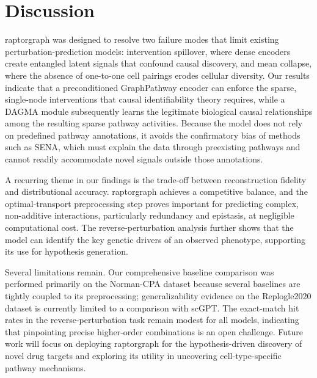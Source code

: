 \section*{Discussion}
\gls{raptorgraph} was designed to resolve two failure modes that limit existing perturbation-prediction models: intervention spillover, where dense encoders create entangled latent signals that confound causal discovery, and mean collapse, where the absence of one-to-one cell pairings erodes cellular diversity.
Our results indicate that a preconditioned GraphPathway encoder can enforce the sparse, single-node interventions that causal identifiability theory requires, while a DAGMA module subsequently learns the legitimate biological causal relationships among the resulting sparse pathway activities.
Because the model does not rely on predefined pathway annotations, it avoids the confirmatory bias of methods such as SENA, which must explain the data through preexisting pathways and cannot readily accommodate novel signals outside those annotations.

A recurring theme in our findings is the trade-off between reconstruction fidelity and distributional accuracy. \gls{raptorgraph} achieves a competitive balance, and the optimal-transport preprocessing step proves important for predicting complex, non-additive interactions, particularly redundancy and epistasis, at negligible computational cost.
The reverse-perturbation analysis further shows that the model can identify the key genetic drivers of an observed phenotype, supporting its use for hypothesis generation.

Several limitations remain. Our comprehensive baseline comparison was performed primarily on the Norman-CPA dataset because several baselines are tightly coupled to its preprocessing; generalizability evidence on the Replogle2020 dataset is currently limited to a comparison with scGPT.
The exact-match hit rates in the reverse-perturbation task remain modest for all models, indicating that pinpointing precise higher-order combinations is an open challenge.
Future work will focus on deploying \gls{raptorgraph} for the hypothesis-driven discovery of novel drug targets and exploring its utility in uncovering cell-type-specific pathway mechanisms.

